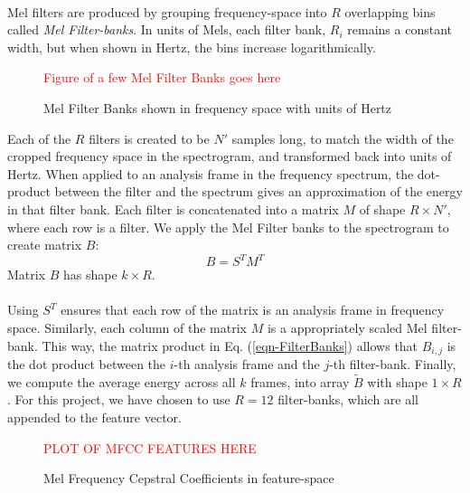 \documentclass[12pt,letterpaper]{article}
\begin{document}
\paragraph*{}Mel filters are produced by grouping frequency-space into $R$ overlapping bins called \textit{Mel Filter-banks}. In units of Mels, each filter bank, $R_i$ remains a constant width, but when shown in Hertz, the bins increase logarithmically. 
\begin{figure}[H]
\begin{center}
\textcolor{red}{Figure of a few Mel Filter Banks goes here}
\end{center}
\caption{Mel Filter Banks shown in frequency space with units of Hertz}
\label{fig-MelFilterBanks}
\end{figure}
Each of the $R$ filters is created to be $N'$ samples long, to match the width of the cropped frequency space in the spectrogram, and transformed back into units of Hertz. When applied to an analysis frame in the frequency spectrum, the dot-product between the filter and the spectrum gives an approximation of the energy in that filter bank. Each filter is concatenated into a matrix $M$ of shape $R \times N'$, where each row is a filter. We apply the Mel Filter banks to the spectrogram to create matrix $B$:
\begin{equation}
\label{eqn-FilterBanks}
B = S^T M^T
\end{equation}
Matrix $B$ has shape $k \times R$.

\paragraph*{}Using $S^T$ ensures that each row of the matrix is an analysis frame in frequency space. Similarly, each column of the matrix $M$ is a appropriately scaled Mel filter-bank. This way, the matrix product in Eq. (\ref{eqn-FilterBanks}) allows that $B_{i,j}$ is the dot product between the $i$-th analysis frame and the $j$-th filter-bank. Finally, we compute the average energy across all $k$ frames, into array $\widetilde{B}$ with shape $1 \times R$. For this project, we have chosen to use $R = 12$ filter-banks, which are all appended to the feature vector. 

\begin{figure}[H]
\begin{center}
\textcolor{red}{PLOT OF MFCC FEATURES HERE}
\end{center}
\caption{Mel Frequency Cepstral Coefficients in feature-space}
\label{fig-FeatureMFBE}
\end{figure}
\end{document}
